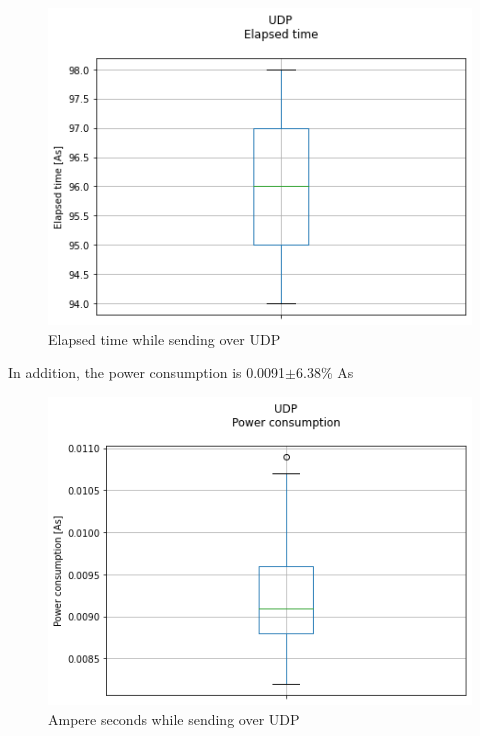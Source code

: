\begin{figure}[h!]
\centering
\includegraphics[width = 0.7 \linewidth]{fig/udp_tcp/udp_boxplot_time.png}
\caption{Elapsed time while sending over UDP}
\label{fig:udp_boxplot_time}
\end{figure}
\linebreak
In addition, the power consumption is 0.0091$\pm$6.38\% As
\linebreak
\begin{figure}[h!]
\centering
\includegraphics[width = 0.7 \linewidth]{fig/udp_tcp/udp_boxplot_As.png}
\caption{Ampere seconds while sending over UDP}
\label{fig:udp_boxplot_As}
\end{figure}
\pagebreak